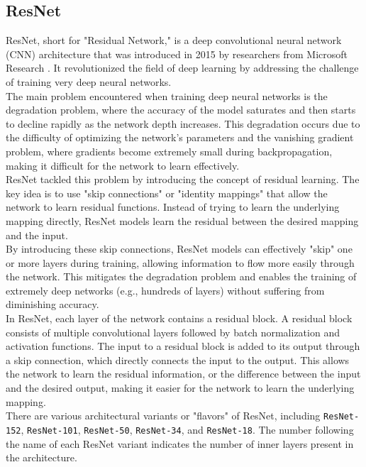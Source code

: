 \newpage 

\subsection{ResNet}

ResNet, short for "Residual Network," is a deep convolutional neural network (CNN) architecture that was introduced in 2015 by researchers from Microsoft Research \cite{ResNetPaper}. It revolutionized the field of deep learning by addressing the challenge of training very deep neural networks. \\

The main problem encountered when training deep neural networks is the degradation problem, where the accuracy of the model saturates and then starts to decline rapidly as the network depth increases. This degradation occurs due to the difficulty of optimizing the network's parameters and the vanishing gradient problem, where gradients become extremely small during backpropagation, making it difficult for the network to learn effectively. \\

ResNet tackled this problem by introducing the concept of residual learning. The key idea is to use "skip connections" or "identity mappings" that allow the network to learn residual functions. Instead of trying to learn the underlying mapping directly, ResNet models learn the residual between the desired mapping and the input. \\

By introducing these skip connections, ResNet models can effectively "skip" one or more layers during training, allowing information to flow more easily through the network. This mitigates the degradation problem and enables the training of extremely deep networks (e.g., hundreds of layers) without suffering from diminishing accuracy. \\

In ResNet, each layer of the network contains a residual block. A residual block consists of multiple convolutional layers followed by batch normalization and activation functions. The input to a residual block is added to its output through a skip connection, which directly connects the input to the output. This allows the network to learn the residual information, or the difference between the input and the desired output, making it easier for the network to learn the underlying mapping.  \\

There are various architectural variants or "flavors" of ResNet, including {\tt ResNet-152}, {\tt ResNet-101}, {\tt ResNet-50}, {\tt ResNet-34}, and {\tt ResNet-18}. The number following the name of each ResNet variant indicates the number of inner layers present in the architecture.

